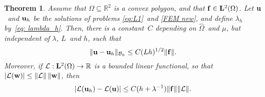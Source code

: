 \documentclass[11pt]{article}
\newcommand{\calB}{\mathcal{B}}
\newcommand{\calL}{\mathcal{L}}
\newcommand{\vf}{{\bf f}}
\newcommand{\vu}{{\bf u}}
\newcommand{\vw}{{\bf w}}
\newcommand{\R}{\mathbb{R}}
\numberwithin{equation}{section}
\newtheorem{theorem}{Theorem}[section]
\begin{document}
\begin{theorem}\label{Convergence theorem}
Assume that $\Omega\subseteq\mathbb{R}^2$ is a convex polygon, and that
$\vf\in\mathbf{L}^2(\Omega)$. Let $\vu$~and $\vu_h$ be the solutions of problems
\eqref{eq:L1}~and \eqref{FEM new}, and define
$\lambda_h$ by~\eqref{eq: lambda_h}.
Then, there is a constant~$C$ depending on $\widehat\Omega$~and $\mu$, but
independent of $\lambda$, $L$~and $h$, such that
\begin{equation}\label{h1 error}
\|\vu-\vu_h\|_{\calB_h}\le C(Lh)^{1/2}\|\vf\|.
\end{equation}
Moreover, if $\calL:{\bf L}^2(\Omega) \to \R$ is a bounded  linear functional,
so that $|\calL(\vw)|\le \|\calL\|\,\|\vw\|$, then
\begin{equation}\label{convergence calL}
|\calL(\vu_h)-\calL(\vu)|\le C(h+\lambda^{-1})\|\vf\|\|\calL\|.
\end{equation}
\end{theorem}
\end{document}
